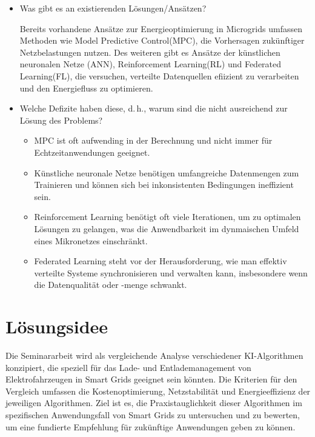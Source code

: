 \documentclass[12pt]{article} %
\begin{document}
\begin{itemize}
\item Was gibt es an existierenden Lösungen/Ansätzen?

Bereits vorhandene Ansätze zur Energieoptimierung in Microgrids umfassen Methoden wie
Model Predictive Control(MPC), die Vorhersagen zukünftiger Netzbelastungen nutzen.
Des weiteren gibt es Ansätze der künstlichen neuronalen Netze (ANN), Reinforcement Learning(RL) und Federated Learning(FL), die versuchen, verteilte Datenquellen efiizient zu verarbeiten und den Energiefluss zu optimieren.
\item Welche Defizite haben diese, d.\,h., warum sind die nicht ausreichend
      zur Lösung des Problems?

     \begin{itemize}
      \item MPC ist oft aufwending in der Berechnung und nicht immer für Echtzeitanwendungen geeignet.
      \item Künstliche neuronale Netze benötigen umfangreiche Datenmengen zum Trainieren und können sich bei inkonsistenten Bedingungen ineffizient sein.
      \item Reinforcement Learning benötigt oft viele Iterationen, um zu optimalen Lösungen zu gelangen, was die Anwendbarkeit im dynmaischen Umfeld eines Mikronetzes einschränkt.
      \item Federated Learning steht vor der Herausforderung, wie man effektiv verteilte Systeme synchronisieren und verwalten kann, insbesondere wenn die Datenqualität oder -menge schwankt.
      \end{itemize}




      
\end{itemize}


\section{Lösungsidee}

Die Seminararbeit wird als vergleichende Analyse verschiedener KI-Algorithmen konzipiert, die speziell für das Lade- und Entlademanagement von Elektrofahrzeugen in Smart Grids geeignet sein könnten. Die Kriterien für den Vergleich umfassen die Kostenoptimierung, Netzstabilität und Energieeffizienz der jeweiligen Algorithmen. Ziel ist es, die Praxistauglichkeit dieser Algorithmen im spezifischen Anwendungsfall von Smart Grids zu untersuchen und zu bewerten, um eine fundierte Empfehlung für zukünftige Anwendungen geben zu können.
\end{document}
